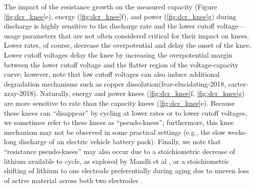 \documentclass[journal=jpcl, manuscript=article, layout=onecolumn]{achemso}
\begin{document}
The impact of the resistance growth on the measured capacity (Figure \ref{fig:dcr_knee}e), energy (\ref{fig:dcr_knee}f), and power (\ref{fig:dcr_knee}g) during discharge is highly sensitive to the discharge rate and the lower cutoff voltage---usage parameters that are not often considered critical for their impact on knees. Lower rates, of course, decrease the overpotential and delay the onset of the knee. Lower cutoff voltages delay the knee by increasing the overpotential margin between the lower cutoff voltage and the flatter region of the voltage-capacity curve; however, note that low cutoff voltages can also induce additional degradation mechanisms such as copper dissolution(fear-elucidating-2018, carter-xray-2018). Naturally, energy and power knees (\ref{fig:dcr_knee}f, \ref{fig:dcr_knee}g) are more sensitive to rate than the capacity knees (\ref{fig:dcr_knee}e). Because these knees can ``disappear'' by cycling at lower rates or to lower cutoff voltages, we sometimes refer to these knees as ``pseudo-knees''; furthermore, this knee mechanism may not be observed in some practical settings (e.g., the slow weeks-long discharge of an electric vehicle battery pack).
Finally, we note that ``resistance pseudo-knees'' may also occur due to a stoichiometric decrease of lithium available to cycle, as explored by Mandli et al \cite{mandli_analysis_2019}, or a stoichiometric shifting of lithium to one electrode preferentially during aging due to uneven loss of active material across both two electrodes \cite{lin_comprehensive_2013}.
\end{document}
